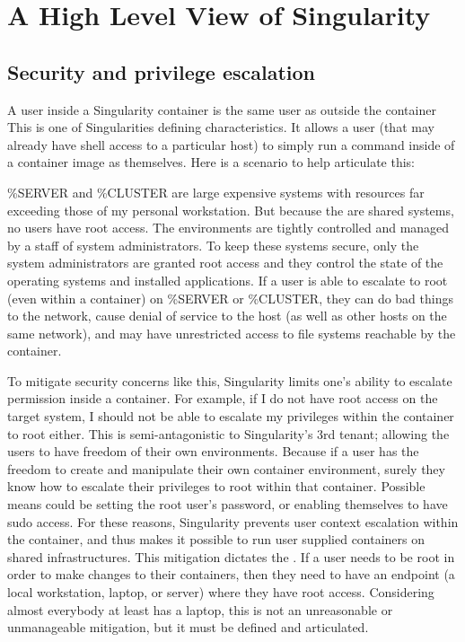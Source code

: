 \documentclass[letterpaper,10pt,english]{sphinxmanual}
\begin{document}
\section{A High Level View of Singularity}
\label{\detokenize{introduction:a-high-level-view-of-singularity}}

\subsection{Security and privilege escalation}
\label{\detokenize{introduction:security-and-privilege-escalation}}\label{\detokenize{introduction:security-and-priviledge-escalation}}
A user inside a Singularity container
is the same user as outside the container
This is one of Singularities defining characteristics. It allows a
user (that may already have shell access to a particular host) to
simply run a command inside of a container image as themselves. Here
is a scenario to help articulate this:

\%SERVER and \%CLUSTER are large expensive systems with resources far
exceeding those of my personal workstation. But because the are
shared systems, no users have root access. The environments are
tightly controlled and managed by a staff of system administrators.
To keep these systems secure, only the system administrators are
granted root access and they control the state of the operating
systems and installed applications. If a user is able to escalate to
root (even within a container) on \%SERVER or \%CLUSTER, they can do
bad things to the network, cause denial of service to the host (as
well as other hosts on the same network), and may have unrestricted
access to file systems reachable by the container.

To mitigate security concerns like this, Singularity limits one’s
ability to escalate permission inside a container. For example, if I
do not have root access on the target system, I should not be able to
escalate my privileges within the container to root either. This is
semi-antagonistic to Singularity’s 3rd tenant; allowing the users to
have freedom of their own environments. Because if a user has the
freedom to create and manipulate their own container environment,
surely they know how to escalate their privileges to root within that
container. Possible means could be setting the root user’s password,
or enabling themselves to have sudo access. For these reasons,
Singularity prevents user context escalation within the container, and
thus makes it possible to run user supplied containers on shared
infrastructures.
This mitigation dictates the {\hyperref[\detokenize{singularity_flow:singularity-flow}]{}}. If a user needs to be root
in order to make changes to their containers, then they need to have
an endpoint (a local workstation, laptop, or server) where they have
root access. Considering almost everybody at least has a laptop, this
is not an unreasonable or unmanageable mitigation, but it must be
defined and articulated.
\end{document}
